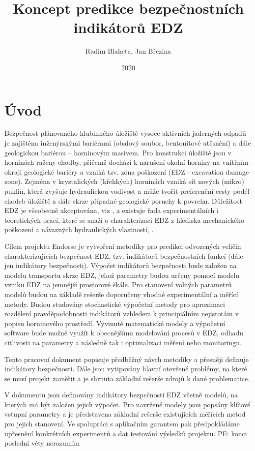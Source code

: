 \documentclass{article}
\title{Koncept predikce bezpečnostních indikátorů EDZ}
\author{Radim Blaheta, Jan Březina}
\date{2020}
\newcommand{\pe}[1]{{\color{orange} PE: #1}}
\begin{document}
\maketitle


\section{Úvod}
Bezpečnost plánovaného hlubinného úložiště vysoce aktivních jaderných odpadů je zajištěna 
inženýrskými bariérami (obalový soubor, bentonitové utěsnění) a dále geologickou bariérou 
– horninovým masivem. Pro konstrukci úložiště jsou v horninách raženy chodby, přičemž dochází 
k narušení okolní horniny na vnitřním okraji geologické bariéry a vzniká tzv. zóna poškození 
(EDZ - excavation damage zone). 
Zejména v krystalických (křehkých) horninách vzniká síť nových (mikro) puklin, která zvyšuje 
hydraulickou vodivost a může tvořit preferenční cesty podél 
chodeb úložiště a dále skrze případné geologické poruchy k povrchu.
Důležitost EDZ je všeobecně
akceptována, viz \cite{Pusch2008}, a existuje řada experimentálních i teoretických prací, které se snaží o charakterizaci EDZ z hlediska mechanického poškození a návazných hydraulických vlastností, \cite{Vavro2016}.

Cílem projektu Endorse je vytvoření metodiky pro predikci odvozených veličin charakterizujících 
bezpečnost EDZ, tzv. indikátorů bezpečnostních funkcí (dále jen indikátory bezpečnosti).
Výpočet indikátorů bezpečnosti bude založen na modelu transportu skrze EDZ, 
jehož parametry budou určeny pomocí modelu vzniku EDZ na jemnější prostorové škále. 
Pro stanovení volných parametrů modelů budou na základě rešerše doporučeny vhodné experimentální a měřící metody.
Budou studovány stochastické výpočetní metody pro aproximaci rozdělení pravděpodobnosti indikátorů
vzhledem k principiálním nejistotám v popisu horninového prostředí.
Vyvinuté matematické modely a výpočetní software bude možné využít k obecnějšímu modelování procesů 
v EDZ, odhadu citlivosti na parametry a následně tak i optimalizaci měření nebo monitoringu.



Tento pracovní dokument popisuje předběžný návrh metodiky a přesněji definuje indikátory 
bezpečnosti. Dále jsou vytipovány hlavní otevřené problémy, na které se musí projekt zaměřit a je 
shrnuta základní rešerše zdrojů k dané problematice. 




V dokumentu jsou definovány indikátory bezpečnosti EDZ včetně modelů, na kterých 
má být založen jejich výpočet. Pro navržené modely jsou popsány klíčové vstupní 
parametry a je představena základní rešerše existujících měřících metod pro jejich
stanovení. Ve spolupráci s aplikačním garantem pak předpokládáme upřesnění konkrétních experimentů
a dat testování výsledků projektu. \pe{konci poslední věty nerozumím}
\end{document}
